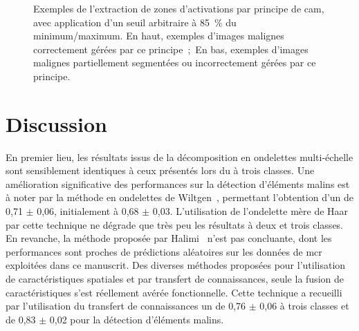 \begin{figure}[p]
    \caption{Exemples de l'extraction de zones d'activations par principe de \gls{cam}, avec application d'un seuil arbitraire à 85~\% du minimum/maximum. En haut, exemples d'images malignes correctement gérées par ce principe~;~En bas, exemples d'images malignes partiellement segmentées ou incorrectement gérées par ce principe.}
    \label{fig:example_image_improvement_ft}
\end{figure}\par
\clearpage

\section{Discussion}
En premier lieu, les résultats issus de la décomposition en ondelettes multi-échelle sont sensiblement identiques à ceux présentés lors du  à trois classes. Une amélioration significative des performances sur la détection d'éléments malins est à noter par la méthode en ondelettes de Wiltgen~, permettant l'obtention d'un \fscore{} de 0,71 $\pm$ 0,06, initialement à 0,68 $\pm$ 0,03. L'utilisation de l'ondelette mère de Haar par cette technique ne dégrade que très peu les résultats à deux et trois classes. En revanche, la méthode proposée par Halimi~ n'est pas concluante, dont les performances sont proches de prédictions aléatoires sur les données de \gls{mcr} exploitées dans ce manuscrit. Des diverses méthodes proposées pour l'utilisation de caractéristiques spatiales et par transfert de connaissances, seule la fusion de caractéristiques s'est réellement avérée fonctionnelle. Cette technique a recueilli par l'utilisation du transfert de connaissances un \fscore{} de 0,76 $\pm$ 0,06 à trois classes et de 0,83 $\pm$ 0,02 pour la détection d'éléments malins.\par

